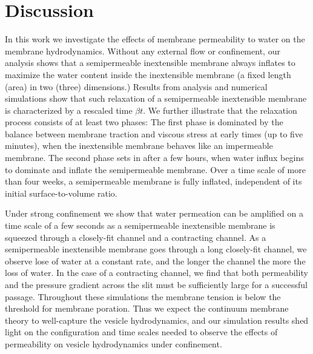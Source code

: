 \documentclass[prb,preprint,showpacs,preprintnumbers,amsmath,amssymb,longbibliography]{revtex4-1}
\begin{document}
\section{Discussion}
In this work we investigate the effects of membrane permeability to
water on the membrane hydrodynamics. Without any external flow or
confinement, our analysis shows that a semipermeable inextensible membrane always
inflates to maximize the water content inside the inextensible membrane (a fixed
length (area) in two (three) dimensions.) Results from analysis and
numerical simulations show that such relaxation of a semipermeable
inextensible membrane  is characterized by a rescaled time $\beta t$. We further
illustrate that the relaxation process consists of at least two phases:
The first phase is dominated by the balance between membrane traction
and viscous stress at early times (up to five minutes), when the inextensible membrane
behaves like an impermeable membrane. The second phase sets in after a
few hours, when water influx begins to dominate and inflate the semipermeable membrane.
Over a time scale of more than four weeks, a semipermeable membrane is
fully inflated, independent of its initial surface-to-volume ratio.

Under strong confinement we show that water permeation can be amplified
on a time scale of a few seconds as a semipermeable inextensible membrane is squeezed through a
closely-fit channel and a contracting channel. As a semipermeable
inextensible membrane goes through a long closely-fit channel, we observe lose of water at a constant rate, and the longer the channel the
more the loss of water. In the case of a contracting channel, we find
that both permeability and the pressure gradient across the slit must be
sufficiently large for a successful passage. Throughout these
simulations the membrane tension is below the threshold for membrane
poration. Thus we expect the continuum membrane theory to well-capture
the vesicle hydrodynamics, and our simulation results shed light on the
configuration and time scales needed to observe the effects of
permeability on vesicle hydrodynamics under confinement. 

\end{document}
